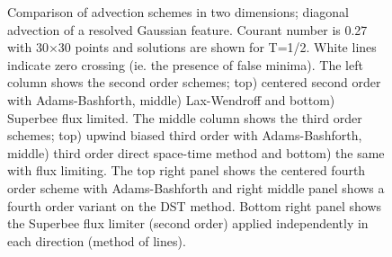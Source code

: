 \begin{figure}
\caption{
Comparison of advection schemes in two dimensions; diagonal advection
of a resolved Gaussian feature. Courant number is 0.27 with
30$\times$30 points and solutions are shown for T=1/2. White lines
indicate zero crossing (ie. the presence of false minima).  The left
column shows the second order schemes; top) centered second order with
Adams-Bashforth, middle) Lax-Wendroff and bottom) Superbee flux
limited. The middle column shows the third order schemes; top) upwind
biased third order with Adams-Bashforth, middle) third order direct
space-time method and bottom) the same with flux limiting. The top
right panel shows the centered fourth order scheme with
Adams-Bashforth and right middle panel shows a fourth order variant on
the DST method. Bottom right panel shows the Superbee flux limiter
(second order) applied independently in each direction (method of
lines).
\label{fig:advect-2d-mid-diag}
}
\end{figure}

